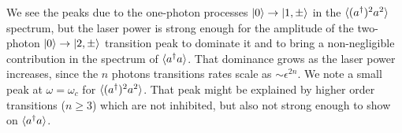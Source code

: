 We see the peaks due to the one-photon processes $| 0 \rangle \rightarrow | 1,\pm \rangle$ in the $\langle (a^\dagger)^2 a^2 \rangle$ spectrum, but the laser power is strong enough for the amplitude of the two-photon $| 0 \rangle \rightarrow | 2,\pm \rangle$ transition peak to dominate it and to bring a non-negligible contribution in the spectrum of $\langle a^\dagger a \rangle$.  That dominance grows as the laser power increases, since the $n$ photons transitions rates scale as $\sim \epsilon^{2n}$. We note a small peak at $\omega=\omega_c$ for $\langle (a^\dagger)^2 a^2 \rangle$. That peak might be explained by higher order transitions ($n\ge3$) which are not inhibited, but also not strong enough to show on $\langle a^\dagger a \rangle$.

